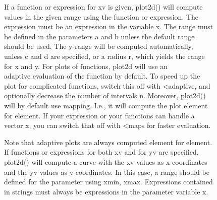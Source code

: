 \documentclass{article}
\newenvironment{eulernotebook}{\par}{\par}
\newenvironment{eulercomment}{\par\medskip}{\par\medskip}
\begin{document}
\begin{eulernotebook}
\begin{eulercomment}
\begin{eulercomment}
\begin{eulercomment}
\begin{eulercomment}
\begin{eulercomment}
If a function or expression for xv is given, plot2d() will compute\\
values in the given range using the function or expression. The\\
expression must be an expression in the variable x. The range must\\
be defined in the parameters a and b unless the default range\\
[-2,2] should be used. The y-range will be computed automatically,\\
unless c and d are specified, or a radius r, which yields the range\\
[-r,r] for x and y. For plots of functions, plot2d will use an\\
adaptive evaluation of the function by default. To speed up the\\
plot for complicated functions, switch this off with \textless{}adaptive, and\\
optionally decrease the number of intervals n. Moreover, plot2d()\\
will by default use mapping. I.e., it will compute the plot element\\
for element. If your expression or your functions can handle a\\
vector x, you can switch that off with \textless{}maps for faster evaluation.

Note that adaptive plots are always computed element for element. \\
If functions or expressions for both xv and for yv are specified,\\
plot2d() will compute a curve with the xv values as x-coordinates\\
and the yv values as y-coordinates. In this case, a range should be\\
defined for the parameter using xmin, xmax. Expressions contained\\
in strings must always be expressions in the parameter variable x.
\end{eulercomment}
\end{eulernotebook}
\end{document}
